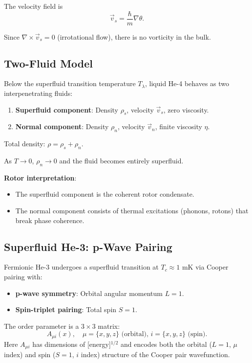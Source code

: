 \documentclass[12pt,a4paper]{article}
\theoremstyle{definition}
\theoremstyle{remark}
\begin{document}
The velocity field is
\begin{equation}
\vec{v}_s = \frac{\hbar}{m} \nabla \theta.
\end{equation}

Since $\nabla \times \vec{v}_s = 0$ (irrotational flow), there is no vorticity in the bulk.

\subsection{Two-Fluid Model}

Below the superfluid transition temperature $T_\lambda$, liquid He-4 behaves as two interpenetrating fluids:
\begin{enumerate}
\item \textbf{Superfluid component}: Density $\rho_s$, velocity $\vec{v}_s$, zero viscosity.
\item \textbf{Normal component}: Density $\rho_n$, velocity $\vec{v}_n$, finite viscosity $\eta$.
\end{enumerate}

Total density: $\rho = \rho_s + \rho_n$.

As $T \to 0$, $\rho_n \to 0$ and the fluid becomes entirely superfluid.

\textbf{Rotor interpretation}:
\begin{itemize}
\item The superfluid component is the coherent rotor condensate.
\item The normal component consists of thermal excitations (phonons, rotons) that break phase coherence.
\end{itemize}

\subsection{Superfluid He-3: p-Wave Pairing}

Fermionic He-3 undergoes a superfluid transition at $T_c \approx 1$ mK via Cooper pairing with:
\begin{itemize}
\item \textbf{p-wave symmetry}: Orbital angular momentum $L=1$.
\item \textbf{Spin-triplet pairing}: Total spin $S=1$.
\end{itemize}

The order parameter is a $3 \times 3$ matrix:
\begin{equation}
A_{\mu i}(x), \quad \mu = \{x,y,z\} \text{ (orbital)}, \, i = \{x,y,z\} \text{ (spin)}.
\end{equation}
Here $A_{\mu i}$ has dimensions of [energy]$^{1/2}$ and encodes both the orbital ($L=1$, $\mu$ index) and spin ($S=1$, $i$ index) structure of the Cooper pair wavefunction.
\end{document}
